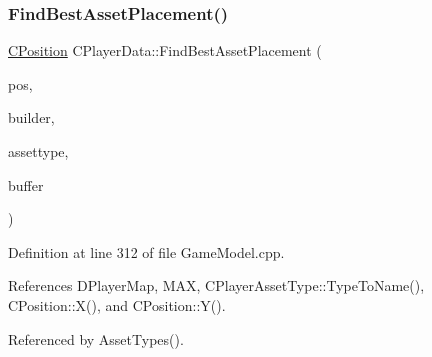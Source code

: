\subsubsection{\texorpdfstring{Find\+Best\+Asset\+Placement()}{FindBestAssetPlacement()}}
{\footnotesize\ttfamily \hyperlink{classCPosition}{C\+Position} C\+Player\+Data\+::\+Find\+Best\+Asset\+Placement (\begin{DoxyParamCaption}\item[{const \hyperlink{classCPosition}{C\+Position} \&}]{pos,  }\item[{std\+::shared\+\_\+ptr$<$ \hyperlink{classCPlayerAsset}{C\+Player\+Asset} $>$}]{builder,  }\item[{\hyperlink{GameDataTypes_8h_a5600d4fc433b83300308921974477fec}{E\+Asset\+Type}}]{assettype,  }\item[{int}]{buffer }\end{DoxyParamCaption})}



Definition at line 312 of file Game\+Model.\+cpp.



References D\+Player\+Map, M\+AX, C\+Player\+Asset\+Type\+::\+Type\+To\+Name(), C\+Position\+::\+X(), and C\+Position\+::\+Y().



Referenced by Asset\+Types().



